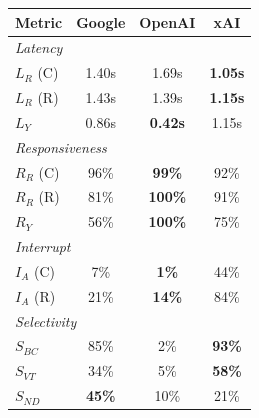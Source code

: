 \begin{tabular}{@{}lccc@{}}
\toprule
\textbf{Metric} & \textbf{Google} & \textbf{OpenAI} & \textbf{xAI} \\
\midrule
\multicolumn{4}{l}{\textit{Latency}} \\
$L_R$ (C) & 1.40s & 1.69s & \textbf{1.05s} \\
$L_R$ (R) & 1.43s & 1.39s & \textbf{1.15s} \\
$L_Y$ & 0.86s & \textbf{0.42s} & 1.15s \\
\midrule
\multicolumn{4}{l}{\textit{Responsiveness}} \\
$R_R$ (C) & 96\% & \textbf{99\%} & 92\% \\
$R_R$ (R) & 81\% & \textbf{100\%} & 91\% \\
$R_Y$ & 56\% & \textbf{100\%} & 75\% \\
\midrule
\multicolumn{4}{l}{\textit{Interrupt}} \\
$I_A$ (C) & 7\% & \textbf{1\%} & 44\% \\
$I_A$ (R) & 21\% & \textbf{14\%} & 84\% \\
\midrule
\multicolumn{4}{l}{\textit{Selectivity}} \\
$S_{BC}$ & 85\% & 2\% & \textbf{93\%} \\
$S_{VT}$ & 34\% & 5\% & \textbf{58\%} \\
$S_{ND}$ & \textbf{45\%} & 10\% & 21\% \\
\bottomrule
\end{tabular}